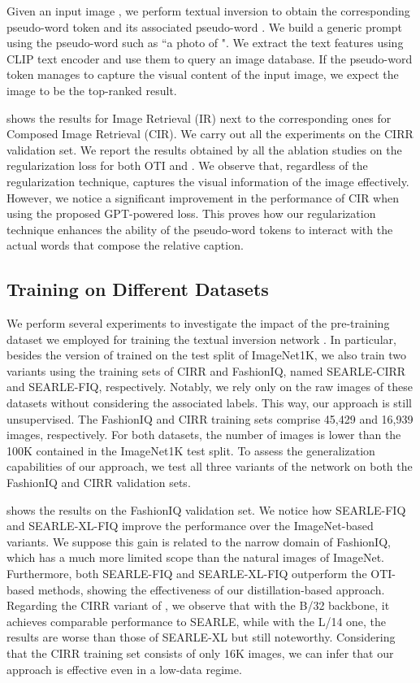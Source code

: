 \documentclass[10pt,twocolumn,letterpaper]{article}
\newcommand{\method}{SEARLE\xspace}
\begin{document}
Given an input image , we perform textual inversion to obtain the corresponding pseudo-word token  and its associated pseudo-word . We build a generic prompt using the pseudo-word  such as ``a photo of ". We extract the text features using CLIP text encoder  and use them to query an image database. If the pseudo-word token manages to capture the visual content of the input image, we expect the image  to be the top-ranked result.

 shows the results for Image Retrieval (IR) next to the corresponding ones for Composed Image Retrieval (CIR). We carry out all the experiments on the CIRR validation set. We report the results obtained by all the ablation studies on the regularization loss for both OTI and . We observe that, regardless of the regularization technique,  captures the visual information of the image effectively. However, we notice a significant improvement in the performance of CIR when using the proposed GPT-powered loss. This proves how our regularization technique enhances the ability of the pseudo-word tokens to interact with the actual words that compose the relative caption.


\subsection{Training  on Different Datasets}
We perform several experiments to investigate the impact of the pre-training dataset we employed for training the textual inversion network . In particular, besides the version of  trained on the test split of ImageNet1K, we also train two variants using the training sets of CIRR and FashionIQ, named \method-CIRR and \method-FIQ, respectively. Notably, we rely only on the raw images of these datasets without considering the associated labels. This way, our approach is still unsupervised. The FashionIQ and CIRR training sets comprise 45,429 and 16,939 images, respectively. For both datasets, the number of images is lower than the 100K contained in the ImageNet1K test split. To assess the generalization capabilities of our approach, we test all three variants of the  network on both the FashionIQ and CIRR validation sets. 

 shows the results on the FashionIQ validation set. We notice how \method-FIQ and \method-XL-FIQ improve the performance over the ImageNet-based variants. We suppose this gain is related to the narrow domain of FashionIQ, which has a much more limited scope than the natural images of ImageNet. Furthermore, both \method-FIQ and \method-XL-FIQ outperform the OTI-based methods, showing the effectiveness of our distillation-based approach. 
Regarding the CIRR variant of , we observe that with the B/32 backbone, it achieves comparable performance to \method, while with the L/14 one, the results are worse than those of \method-XL but still noteworthy. Considering that the CIRR training set consists of only 16K images, we can infer that our approach is effective even in a low-data regime. 
\end{document}
